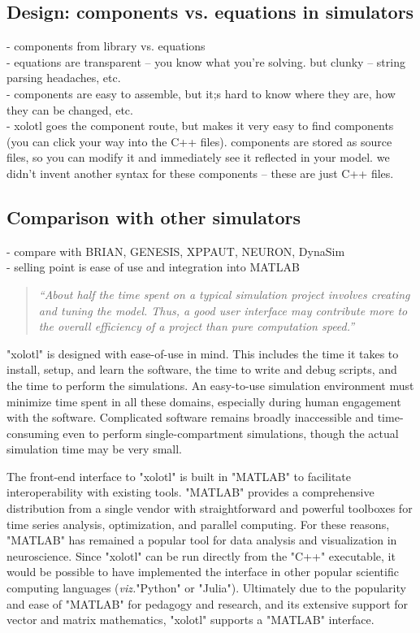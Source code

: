 \documentclass{frontiersSCNS} %
\newcommand{\viz}{\textit{viz.}\xspace}
\begin{document}
\subsection{Design: components vs. equations in simulators }

- components from library vs. equations\\
- equations are transparent -- you know what you're solving. but clunky -- string parsing headaches, etc. \\
- components are easy to assemble, but it;s hard to know where they are, how they can be changed, etc.\\
- xolotl goes the component route, but makes it very easy to find components (you can click your way into the C++ files). components are stored as source files, so you can modify it and immediately see it reflected in your model. we didn't invent another syntax for these components -- these are just C++ files. \\

\subsection{Comparison with other simulators}

- compare with BRIAN, GENESIS, XPPAUT, NEURON, DynaSim \\
- selling point is ease of use and integration into MATLAB

\begin{quote}
	\textit{``About half the time spent on a typical simulation project involves creating and tuning the model. Thus, a good user interface may contribute more to the overall efficiency of a project than pure computation speed.''}
	\begin{flushright}
		\cite{deschutterConsumerGuideNeuronal1992}
	\end{flushright}
\end{quote}

"xolotl" is designed with ease-of-use in mind. This includes the time it takes to install, setup, and learn the software, the time to write and debug scripts, and the time to perform the simulations. An easy-to-use simulation environment must minimize time spent in all these domains, especially during human engagement with the software. Complicated software remains broadly inaccessible and time-consuming even to perform single-compartment simulations, though the actual simulation time may be very small.

The front-end interface to "xolotl" is built in "MATLAB" to facilitate interoperability with existing tools. "MATLAB" provides a comprehensive distribution from a single vendor with straightforward and powerful toolboxes for time series analysis, optimization, and parallel computing. For these reasons, "MATLAB" has remained a popular tool for data analysis and visualization in neuroscience. Since "xolotl" can be run directly from the "C++" executable, it would be possible to have implemented the interface in other popular scientific computing languages (\viz "Python" or "Julia"). Ultimately due to the popularity and ease of "MATLAB" for pedagogy and research, and its extensive support for vector and matrix mathematics, "xolotl" supports a "MATLAB" interface.
\end{document}
